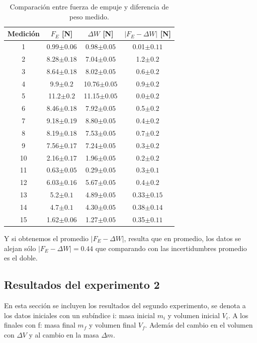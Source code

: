 \documentclass[a4paper]{article}
\begin{document}
\begin{table}[H]
  \centering
    \begin{tabular}{|c|c|c|c|} \hline
    Medición & $F_E$ [N] & $\Delta W$ [N] & $|F_E - \Delta W |$ [N] \\ \hline
    1     & 0.99$\pm0.06$  & 0.98$\pm0.05$  & 0.01$\pm0.11$ \\ \hline
    2     & 8.28$\pm0.18$  & 7.04$\pm0.05$  & 1.2$\pm0.2$ \\ \hline
    3     & 8.64$\pm0.18$  & 8.02$\pm0.05$  & 0.6$\pm0.2$\\ \hline
    4     & 9.9$\pm0.2$  & 10.76$\pm0.05$ & 0.9$\pm0.2$ \\ \hline
    5     & 11.2$\pm0.2$ & 11.15$\pm0.05$ & 0.0$\pm0.2$ \\ \hline
    6     & 8.46$\pm0.18$  & 7.92$\pm0.05$  & 0.5$\pm0.2$ \\ \hline
    7     & 9.18$\pm0.19$  & 8.80$\pm0.05$  & 0.4$\pm0.2$ \\ \hline
    8     & 8.19$\pm0.18$  & 7.53$\pm0.05$  & 0.7$\pm0.2$ \\ \hline
    9     & 7.56$\pm0.17$  & 7.24$\pm0.05$  & 0.3$\pm0.2$ \\ \hline
    10    & 2.16$\pm0.17$  & 1.96$\pm0.05$  & 0.2$\pm0.2$ \\ \hline
    11    & 0.63$\pm0.05$  & 0.29$\pm0.05$  & 0.3$\pm0.1$ \\ \hline
    12    & 6.03$\pm0.16$  & 5.67$\pm0.05$  & 0.4$\pm0.2$ \\ \hline
    13    & 5.2$\pm0.1$  & 4.89$\pm0.05$  & 0.33$\pm0.15$ \\ \hline
    14    & 4.7$\pm0.1$  & 4.30$\pm0.05$  & 0.38$\pm0.14$ \\ \hline
    15    & 1.62$\pm0.06$  & 1.27$\pm0.05$  & 0.35$\pm0.11$ \\ \hline
    \end{tabular}%
    \caption{Comparación entre fuerza de empuje y diferencia de peso medido.}
\end{table}%

Y si obtenemos el promedio $|F_E - \Delta W |$, resulta que en promedio, los datos se alejan sólo $|F_E - \Delta W |=0.44$ que comparando con las incertidumbres promedio es el doble.

\subsection*{Resultados del experimento 2}
En esta sección se incluyen los resultados del segundo experimento, se denota a los datos iniciales con un subíndice i: masa inicial $m_i$ y volumen inicial $V_i$. A los finales con f: masa final $m_f$ y volumen final $V_f$. Además del cambio en el volumen con $\Delta V$ y al cambio en la masa $\Delta m$.
\end{document}

